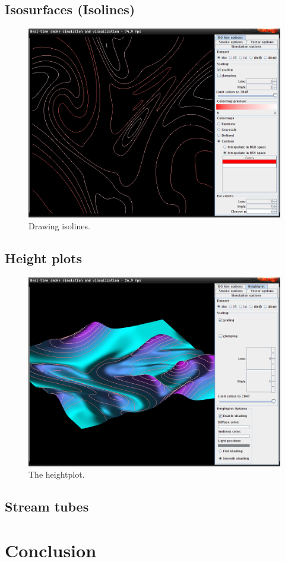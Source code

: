\documentclass[a4paper,11pt,twoside]{report}
\begin{document}
	\section{Isosurfaces (Isolines)}
		\begin{figure}[h]
		\centering
		\includegraphics[scale=\imagescalefactor]{images/step5.png}
		\caption{Drawing isolines.}\label{fig:step5}
		\end{figure}
		\newpage
	\section{Height plots}
		\begin{figure}[h]
		\centering
		\includegraphics[scale=\imagescalefactor]{images/step6.png}
		\caption{The heightplot.}\label{fig:step6}
		\end{figure}
		\newpage
	\section{Stream tubes}
\chapter{Conclusion}
\end{document}
